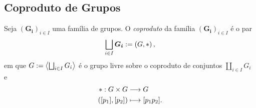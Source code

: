 \subsection{Coproduto de Grupos}

\begin{defi}
Seja $(\bm{G_i})_{i \in I}$ uma família de grupos. O \emph{coproduto} da família $(\bm{G_i})_{i \in I}$ é o par
	\begin{equation*}
	\bigsqcup_{i \in I} \bm{G_i} := \left(G,\ast \right),
	\end{equation*}
em que $G := \left\langle \bigsqcup_{i \in I} G_i \right\rangle$ é o grupo livre sobre o coproduto de conjuntos $\coprod_{i \in I} G_i$ e
	\begin{align*}
	{\ast}: {G \times G} &\longrightarrow {G} \\{([p_1],[p_2])} &\longmapsto {[p_1p_2]}.
	\end{align*}
\end{defi}

